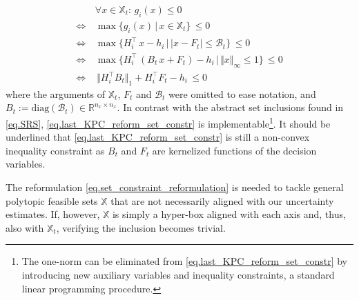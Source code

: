 \begin{subequations}
	\label{eq.set_constraint_reformulation}
\begin{align}
	& \forall x \in \mathbb{X}_t: \, g_i(x) \leq 0 \ \\[3pt]
	\Leftrightarrow \, & \max \{ g_i(x) \, | \, x \in \mathbb{X}_t \} \, \leq 0 \\[3pt]
	\Leftrightarrow \, & \max \{ H_i^\top \, x - h_i \, | \, \vert x - F_t \vert \leq \mathcal{B}_t \} \, \leq 0 \label{eq.constr} \\[3pt]
	\Leftrightarrow \, & \max \{ H_i^\top \, (B_t \, x+F_t) - h_i \, | \, \Vert x \Vert_\infty \leq 1 \} \, \leq 0 \\[3pt]
	\Leftrightarrow \, & \, \Vert H_i^\top B_t \Vert_1 + H_i^\top F_t - h_i \, \leq 0 \label{eq.last_KPC_reform_set_constr}
\end{align}
\end{subequations}
where the arguments of $\mathbb{X}_t$, $F_t$ and $\mathcal{B}_t$ were omitted to ease notation, and $B_t := \text{diag}\left( \mathcal{B}_t \right) \in \mathbb{R}^{n_x \times n_x}$. In contrast with the abstract set inclusions found in \eqref{eq.SRS}, \eqref{eq.last_KPC_reform_set_constr} is implementable\footnote{The one-norm can be eliminated from \eqref{eq.last_KPC_reform_set_constr} by introducing new auxiliary variables and inequality constraints, a standard linear programming procedure.}. It should be underlined that \eqref{eq.last_KPC_reform_set_constr} is still a non-convex inequality constraint as $B_t$ and $F_t$ are kernelized functions of the decision variables.

\begin{remark}
	The reformulation \eqref{eq.set_constraint_reformulation} is needed to tackle general polytopic feasible sets $\mathbb{X}$ that are not necessarily aligned with our uncertainty estimates. If, however, $\mathbb{X}$ is simply a hyper-box aligned with each axis and, thus, also with $\mathbb{X}_t$, verifying the inclusion becomes trivial.
\end{remark}

